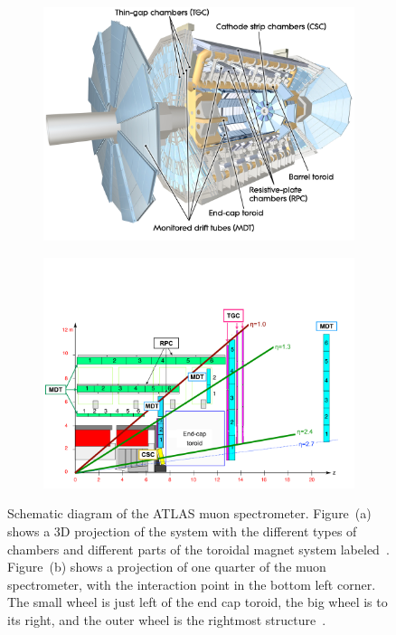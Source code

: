 \begin{figure}[h]
\centering
\begin{subfigure}{.5\textwidth}
  \centering
  \includegraphics[width=\linewidth]{figures/atlas_muon_spectrometer.jpg}
  \caption{}
  \label{fig:atlas_muon_spectrometer_3D}
\end{subfigure}%
\begin{subfigure}{.5\textwidth}
  \centering
  \includegraphics[width=\linewidth]{figures/atlas_old_muon_spec_quarter_cut_recolour.png}
  \caption{}
  \label{fig:atlas_muon_spectrometer_cut}
\end{subfigure}
\caption{Schematic diagram of the ATLAS muon spectrometer. Figure~(a) shows a 3D projection of the system with the different types of chambers and different parts of the toroidal magnet system labeled~\cite{collaboration_atlas_2008}. Figure~(b) shows a projection of one quarter of the muon spectrometer, with the interaction point in the bottom left corner. The small wheel is just left of the end cap toroid, the big wheel is to its right, and the outer wheel is the rightmost structure~\cite{atlas_performance_muon_trigger_2015}.}
\label{fig:atlas_muon_spectrometer}
\end{figure}

